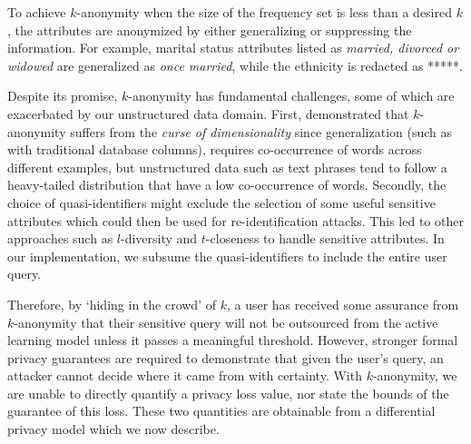 \documentclass[letterpaper]{article}
\begin{document}
To achieve $k$-anonymity when the size of the frequency set is less than a desired \begin{math} k \end{math}, the attributes are anonymized by either generalizing or suppressing the information. For example, marital status attributes listed as \textit{married, divorced or widowed} are generalized as \textit{once married}, while the ethnicity is redacted as *****. 


Despite its promise, $k$-anonymity has fundamental challenges, some of which are exacerbated by our unstructured data domain. First, \cite{aggarwal2005k} demonstrated that $k$-anonymity suffers from the \textit{curse of dimensionality} since generalization (such as with traditional database columns), requires co-occurrence of words across different examples, but unstructured data such as text phrases tend to follow a heavy-tailed distribution that have a low co-occurrence of words. Secondly, the choice of quasi-identifiers might exclude the selection of some useful sensitive attributes which could then be used for re-identification attacks. This led to other approaches such as $l$-diversity \cite{machanavajjhala2006diversity} and $t$-closeness \cite{li2007t} to handle sensitive attributes. In our implementation, we subsume the quasi-identifiers to include the entire user query.


Therefore, by `hiding in the crowd' of $k$, a user has received some assurance from $k$-anonymity that their sensitive query will not be outsourced from the active learning model unless it passes a meaningful threshold. However, stronger formal privacy guarantees are required to demonstrate that given the user's query, an attacker cannot decide where it came from with certainty. With $k$-anonymity, we are unable to directly quantify a privacy loss value, nor state the bounds of the guarantee of this loss. These two quantities are obtainable from a differential privacy model which we now describe. 
\end{document}
